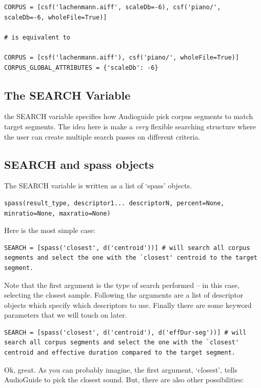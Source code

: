 \documentclass{article}
\begin{document}
\begin{spacing}{1.2}
\begin{lstlisting}
CORPUS = [csf('lachenmann.aiff', scaleDb=-6), csf('piano/', scaleDb=-6, wholeFile=True)]

# is equivalent to 

CORPUS = [csf('lachenmann.aiff'), csf('piano/', wholeFile=True)]
CORPUS_GLOBAL_ATTRIBUTES = {'scaleDb': -6}
\end{lstlisting}


\subsection{The SEARCH Variable}
the SEARCH variable specifies how Audioguide pick corpus segments to match target segments.  The idea here is make a \emph{very} flexible searching structure where the user can create multiple search passes on different criteria.


\subsection{SEARCH and spass objects}

The SEARCH variable is written as a list of `spass' objects.  
\begin{lstlisting}
spass(result_type, descriptor1... descriptorN, percent=None, minratio=None, maxratio=None)
\end{lstlisting}

Here is the most simple case:
\begin{lstlisting}
SEARCH = [spass('closest', d('centroid'))] # will search all corpus segments and select the one with the `closest' centroid to the target segment.
\end{lstlisting}

Note that the first argument is the type of search performed -- in this case, selecting the closest sample.  Following the arguments are a list of descriptor objects which specify which descriptors to use.  Finally there are some keyword parameters that we will touch on later.

\begin{lstlisting}
SEARCH = [spass('closest', d('centroid'), d('effDur-seg'))] # will search all corpus segments and select the one with the `closest' centroid and effective duration compared to the target segment.
\end{lstlisting}

Ok, great.  As you can probably imagine, the first argument, `closest', tells AudioGuide to pick the closest sound.  But, there are also other possibilities:


\end{spacing}
\end{document}
